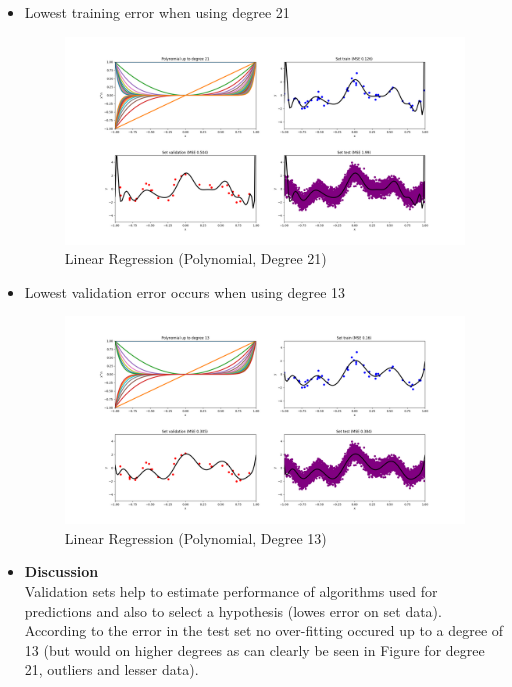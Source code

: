 \documentclass[12pt,halfline,a4paper]{ouparticle}
\begin{document}
\begin{itemize}
  \item Lowest training error when using degree 21
  	\begin{figure}[H]
    \centering
	        \includegraphics[width=\textwidth]{figures/linreg_degree_21.png}
	    \caption{Linear Regression (Polynomial, Degree 21)}
	\end{figure}
  \item Lowest validation error occurs when using degree 13
	\begin{figure}[H]
    \centering
	        \includegraphics[width=\textwidth]{figures/linreg_degree_13.png}
	    \caption{Linear Regression (Polynomial, Degree 13)}
	\end{figure}
		
  \item \textbf{Discussion}\\
  Validation sets help to estimate performance of algorithms used for
  predictions and also to select a hypothesis (lowes error on set data).
  According to the error in the test set no over-fitting occured up to a
  degree of 13 (but would on higher degrees as can clearly be seen in Figure for
  degree 21, outliers and lesser data).
  
\end{itemize}
\end{document}
